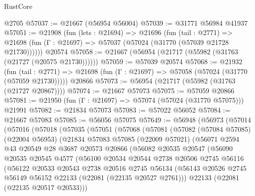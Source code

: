\begin{lexlean}{RustCore}
\begin{coremodule}
    @2705
@57037 := @21667 (@56954 @56004)
@57039 := @31771 @56984 @41937
@57051 := @21908
    (fun (lets : @21694) =>
    @21696
      (fun (tail : @2771) =>
      @21698 (fun (Γ : @21697) => @57037 (@57024 (@31770 (@57039 @21728 @21730))))))
    @20574
@57058 := @21667 (@56954 (@21717 (@55982 (@31763 (@21727 (@20575 @21730))))))
@57059 := @57039 @20574
@57068 := @21932
    (fun (tail : @2771) => @21698 (fun (Γ : @21697) => @57058 (@57024 (@31770 (@57059 @21730)))))
    @20866
@57073 := @56954 (@21717 (@55982 (@31763 (@21727 @20867))))
@57074 := @21667 @57073
@57075 := @57059 @20866
@57081 := @21950 (fun (Γ : @21697) => @57074 (@57024 (@31770 @57075))) @21991
@57082 := @21834 @57073
@57083 := @57022 @56052
@57084 := @21667 @57083
@57085 := @56056 @57075
@57649 := @56948
    (@56973
      (@57014
        (@57016
          (@57018
            (@57035
              (@57051
                (@57068
                  (@57081
                    (@57082
                      (@57084 @57085)
                      (@22004 @56953)
                      (@21834
                        @57083
                        @57085
                        (@22009 @57021)
                        (@56071
                          @2594
                          @43
                          @20549
                          @28
                          @3687
                          @20573
                          @20866
                          (@56082
                            @20535
                            @20547
                            (@56090
                              @20535
                              @20545
                              @4577
                              (@56100
                                @20534
                                @20544
                                @2738
                                @20506
                                @2745
                                @56116
                                (@56122
                                  @20533
                                  @20543
                                  @2738
                                  @20516
                                  @2745
                                  @56134
                                  (@56143
                                    @20526
                                    @2745
                                    @56149
                                    @56152
                                    @22133
                                    (@22081 (@22135 @20527 @2761)))
                                  @22133
                                  (@22081 (@22135 @20517 @20533)))

\end{coremodule}
\end{lexlean}
